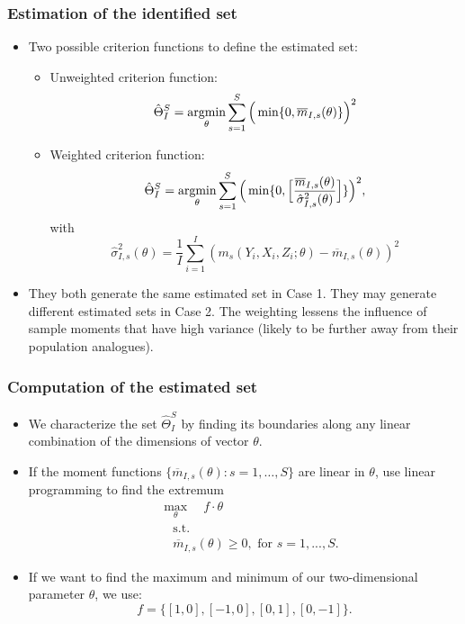 \begin{frame}
\frametitle{Estimation of the identified set}

\begin{itemize}
	\item Two possible criterion functions to define the estimated set:
	\begin{itemize}
		\item Unweighted criterion function:
		\begin{equation*}
		\hat{\Theta}^{S}_{I} = \argmin_{\theta}\sum_{s=1}^{S}\Big(\min\{0,\overline{m}_{I,s}(\theta)\}\Big)^{2}
		\end{equation*}
		\item Weighted criterion function:
		\begin{equation*}
		\hat{\Theta}^{S}_{I} = \argmin_{\theta}\sum_{s=1}^{S}\Big(\min\{0,\Big[\frac{\overline{m}_{I,s}(\theta)}{\hat{\sigma}^{2}_{I,s}(\theta)}\Big]\}\Big)^{2},
		\end{equation*}
		with
		\begin{equation*}
		\hat{\sigma}^{2}_{I,s}(\theta)=\frac{1}{I}\sum_{i=1}^{I}(m_{s}(Y_{i},X_{i},Z_{i};\theta)-\overline{m}_{I,s}(\theta))^{2}
		\end{equation*}
	\end{itemize}
	\item They both generate the same estimated set in Case 1. They may generate different estimated sets in Case 2. The weighting lessens the influence of sample moments that have high variance (likely to be further away from their population analogues).
\end{itemize}
\end{frame}
\begin{frame}
\frametitle{Computation of the estimated set}

\begin{itemize}
	\item We characterize the set $\hat{\Theta}^{S}_{I}$ by finding its boundaries along any linear combination of the dimensions of vector $\theta$.
	 \item If the moment functions $\{\overline{m}_{I,s}(\theta ): s=1,\dots,S\}$ are linear in $\theta$, use linear programming to find the extremum 
	\begin{equation}
	\begin{split}
	& \max_{\theta}\quad f\cdot \theta \\
	& \quad \text{s.t.} \\
	& \quad \overline{m}_{I,s}(\theta )\geq 0,\text{ for }s=1,...,S.
	\label{eq: optvert}
	\end{split}
	\end{equation}
	\item If we want to find the maximum and minimum of our two-dimensional parameter $\theta$, we use:
	\begin{equation*}
	f=\{[1,0],[-1,0],[0,1],[0,-1]\}.
	\end{equation*}
\end{itemize}
\end{frame}
